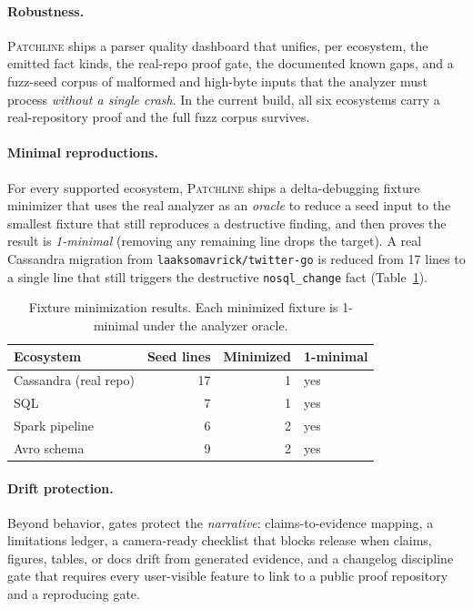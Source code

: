 \documentclass[11pt]{article}
\newcommand{\tool}{\textsc{Patchline}}
\newcommand{\code}[1]{\texttt{#1}}
\begin{document}
\paragraph{Robustness.} \tool{} ships a parser quality dashboard that unifies, per ecosystem, the
emitted fact kinds, the real-repo proof gate, the documented known gaps, and a fuzz-seed corpus of
malformed and high-byte inputs that the analyzer must process \emph{without a single crash}. In the
current build, all six ecosystems carry a real-repository proof and the full fuzz corpus survives.

\paragraph{Minimal reproductions.} For every supported ecosystem, \tool{} ships a delta-debugging
fixture minimizer that uses the real analyzer as an \emph{oracle} to reduce a seed input to the
smallest fixture that still reproduces a destructive finding, and then proves the result is
\emph{1-minimal} (removing any remaining line drops the target). A real Cassandra migration from
\code{laaksomavrick/twitter-go} is reduced from 17 lines to a single line that still triggers the
destructive \code{nosql\_change} fact (Table~\ref{tab:min}).

\begin{table}[h]\centering\small
\caption{Fixture minimization results. Each minimized fixture is 1-minimal under the analyzer oracle.}
\label{tab:min}
\begin{tabular}{lrrl}
\toprule
\textbf{Ecosystem} & \textbf{Seed lines} & \textbf{Minimized} & \textbf{1-minimal} \\
\midrule
Cassandra (real repo) & 17 & 1 & yes \\
SQL & 7 & 1 & yes \\
Spark pipeline & 6 & 2 & yes \\
Avro schema & 9 & 2 & yes \\
\bottomrule
\end{tabular}
\end{table}

\paragraph{Drift protection.} Beyond behavior, gates protect the \emph{narrative}: claims-to-evidence
mapping, a limitations ledger, a camera-ready checklist that blocks release when claims, figures,
tables, or docs drift from generated evidence, and a changelog discipline gate that requires every
user-visible feature to link to a public proof repository and a reproducing gate.
\end{document}
